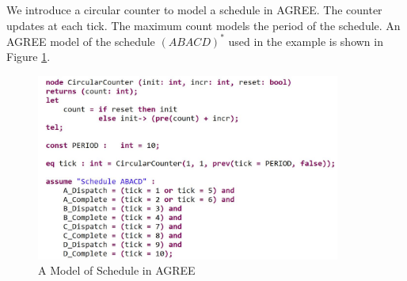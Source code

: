We introduce a circular counter to model a schedule in AGREE. The counter updates at each tick. The maximum count models the period of the schedule. An AGREE model of the schedule $(ABACD)^*$ used in the example is shown in Figure \ref{schedule}.
\begin{figure}[ht!]
\centering
\includegraphics[width=100mm]{schedule.jpg}
\caption{A Model of Schedule in AGREE\label{schedule}}
\end{figure}


%				
%

%	
%

